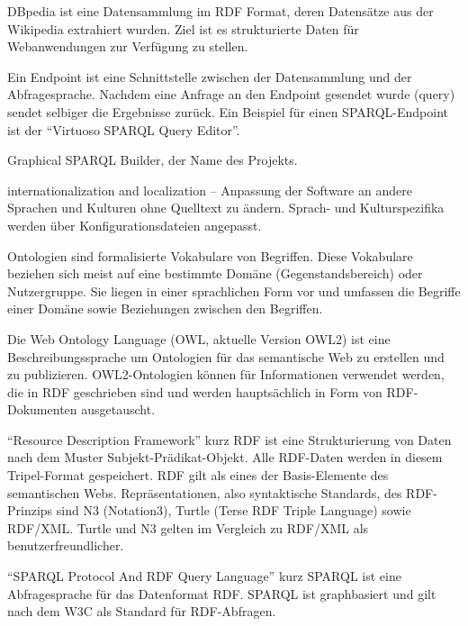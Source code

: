 {DBpedia ist eine Datensammlung im RDF Format, deren Datensätze aus der Wikipedia extrahiert wurden. Ziel ist es strukturierte Daten für Webanwendungen zur Verfügung zu stellen.
\cite{dbpedia-wikipedia,dbpedia,dbpedia-datasets}
}

{Ein Endpoint ist eine Schnittstelle zwischen der Datensammlung und der 
Abfragesprache. Nachdem eine Anfrage an den Endpoint gesendet wurde (query)  sendet selbiger die Ergebnisse zurück. Ein Beispiel für einen SPARQL-Endpoint ist der “Virtuoso SPARQL Query Editor”. \cite{dbpedia-sparql}}

{Graphical SPARQL Builder, der Name des Projekts. \cite{swp14-gsb}}

{internationalization and localization -- Anpassung der Software an andere Sprachen und Kulturen ohne Quelltext zu ändern. Sprach- und Kulturspezifika werden über Konfigurationsdateien angepasst.}

{Ontologien sind formalisierte Vokabulare von Begriffen. Diese Vokabulare beziehen sich meist auf eine bestimmte Domäne (Gegenstandsbereich) oder Nutzergruppe. Sie liegen in einer sprachlichen Form vor und umfassen die Begriffe einer Domäne sowie Beziehungen zwischen den Begriffen. \cite{owl,ontologie-wiki,fraunhofer}
}

{Die Web Ontology Language (OWL, aktuelle Version OWL2) ist eine Beschreibungssprache um Ontologien für das semantische Web zu erstellen und zu publizieren. OWL2-Ontologien können für Informationen verwendet werden, die in RDF geschrieben sind und werden hauptsächlich in Form von RDF-Dokumenten ausgetauscht.
\cite{owl}
}

{“Resource Description Framework” kurz RDF ist eine Strukturierung von Daten nach
dem Muster Subjekt-Prädikat-Objekt. Alle RDF-Daten werden in diesem Tripel-Format 
gespeichert. RDF gilt als eines der Basis-Elemente des semantischen Webs.
Repräsentationen, also syntaktische Standards, des RDF-Prinzips sind N3 (Notation3), 
Turtle (Terse RDF Triple Language) sowie RDF/XML. Turtle und N3 gelten im Vergleich zu RDF/XML als benutzerfreundlicher. \cite{rdf-primer,rdf-wiki,rdf-xml-wiki}}

{“SPARQL Protocol And RDF Query Language” kurz SPARQL ist eine Abfragesprache für das Datenformat RDF. SPARQL ist graphbasiert und gilt nach dem W3C als Standard für RDF-Abfragen. \cite{w3c-rdf-sparql-query,sparql-wiki}}

